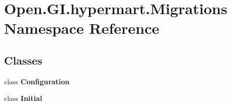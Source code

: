 \section{Open.\+G\+I.\+hypermart.\+Migrations Namespace Reference}
\label{namespace_open_1_1_g_i_1_1hypermart_1_1_migrations}
\subsection*{Classes}
\begin{DoxyCompactItemize}
\item 
class {\bfseries Configuration}
\item 
class \textbf{ Initial}
\end{DoxyCompactItemize}
